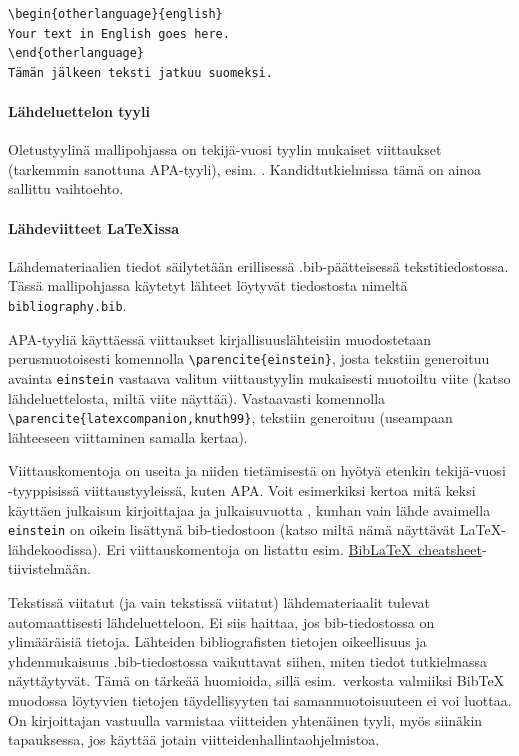 \documentclass[finnish, manual, a4paper]{csthesis}
\begin{document}
\begin{verbatim}
\begin{otherlanguage}{english} 
Your text in English goes here. 
\end{otherlanguage}
Tämän jälkeen teksti jatkuu suomeksi.
\end{verbatim}

\paragraph{Lähdeluettelon tyyli}
Oletustyylinä mallipohjassa on tekijä-vuosi tyylin mukaiset viittaukset (tarkemmin sanottuna APA-tyyli), esim. \parencite{einstein}. Kandidtutkielmissa tämä on ainoa sallittu vaihtoehto.

\paragraph{Lähdeviitteet \LaTeX{}issa}

Lähdemateriaalien tiedot säilytetään erillisessä .bib-päättei\-ses\-sä tekstitiedostossa. Tässä mallipohjassa käy\-te\-tyt lähteet löytyvät tiedostosta nimeltä \texttt{bibliography.bib}.

APA-tyyliä käyttäessä viittaukset kirjallisuuslähteisiin muodostetaan perusmuotoisesti komennolla \texttt{\textbackslash parencite\{einstein\}}, josta tekstiin generoituu avainta \texttt{einstein} vastaava valitun viittaustyylin mukaisesti muotoiltu viite \parencite{einstein} (katso lähdeluettelosta, miltä viite näyttää). Vastaavasti komennolla \texttt{\textbackslash parencite\{latexcompanion,knuth99\}},  tekstiin generoituu \parencite{latexcompanion,knuth99} (useampaan lähteeseen viittaminen samalla kertaa). 

Viittauskomentoja on useita ja niiden tietämisestä on hyötyä etenkin tekijä-vuosi -tyyppi\-sis\-sä viittaustyyleissä, kuten APA. Voit esimerkiksi kertoa mitä \textcite{einstein} keksi käyttäen julkaisun  \parencite{einstein} kirjoittajaa \citeauthor{einstein} ja julkaisuvuotta \citeyear{einstein}, kunhan vain lähde avaimella \texttt{einstein} on oikein lisättynä bib-tiedostoon (katso miltä nämä näyttävät \LaTeX{}-lähde\-koo\-dis\-sa). Eri viittauskomentoja on listattu esim. \href{https://tug.ctan.org/info/biblatex-cheatsheet/biblatex-cheatsheet.pdf}{Bib\LaTeX\ cheatsheet}-tiivis\-tel\-mään.

Tekstissä viitatut (ja vain tekstissä viitatut) lähdemateriaalit tulevat automaattisesti lähdeluetteloon. Ei siis haittaa, jos bib-tiedostossa on ylimääräisiä tietoja. Lähteiden bibliografisten tietojen oikeellisuus ja yhdenmukaisuus .bib-tiedostossa vaikuttavat siihen, miten tiedot tutkielmassa näyttäytyvät. Tämä on tärkeää huomioida, sillä esim.\ verkosta valmiiksi {Bib\TeX} muodossa löytyvien tietojen täydellisyyten tai samanmuotoisuuteen ei voi luottaa. On kirjoittajan vastuulla varmistaa viitteiden yhtenäinen tyyli, myös siinäkin tapauksessa, jos käyttää jotain viitteidenhallintaohjelmistoa. 
\end{document}
